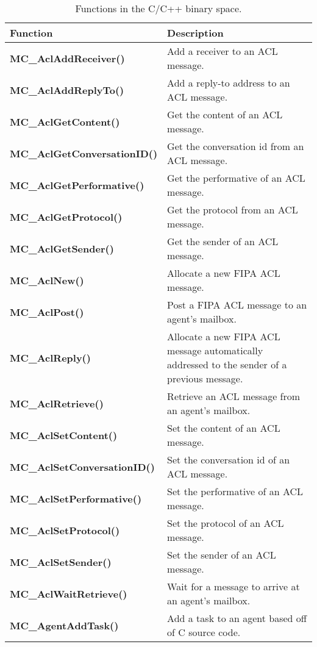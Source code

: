 \begin{table}[!hp]
\capstart
\begin{center}
\caption{Functions in the C/C++ binary space.}
\begin{tabular}{p{78 mm}p{77 mm}}
\hline
Function & Description \\
\hline
{\bf MC\_AclAddReceiver()} \dotfill & Add a receiver to an ACL message. \\
{\bf MC\_AclAddReplyTo()} \dotfill & Add a reply-to address to an ACL message. \\
{\bf MC\_AclGetContent()} \dotfill & Get the content of an ACL message. \\
{\bf MC\_AclGetConversationID()} \dotfill & Get the conversation id from an ACL message. \\
{\bf MC\_AclGetPerformative()} \dotfill & Get the performative of an ACL message. \\
{\bf MC\_AclGetProtocol()} \dotfill & Get the protocol from an ACL message. \\
{\bf MC\_AclGetSender()} \dotfill & Get the sender of an ACL message. \\
{\bf MC\_AclNew()} \dotfill & Allocate a new FIPA ACL message. \\
{\bf MC\_AclPost()} \dotfill & Post a FIPA ACL message to an agent's mailbox. \\
{\bf MC\_AclReply()} \dotfill & Allocate a new FIPA ACL message automatically addressed to the sender of a previous message. \\
{\bf MC\_AclRetrieve()} \dotfill & Retrieve an ACL message from an agent's mailbox. \\
{\bf MC\_AclSetContent()} \dotfill & Set the content of an ACL message. \\
{\bf MC\_AclSetConversationID()} \dotfill & Set the conversation id of an ACL message. \\
{\bf MC\_AclSetPerformative()} \dotfill & Set the performative of an ACL message. \\
{\bf MC\_AclSetProtocol()} \dotfill & Set the protocol of an ACL message. \\
{\bf MC\_AclSetSender()} \dotfill & Set the sender of an ACL message. \\
{\bf MC\_AclWaitRetrieve()} \dotfill & Wait for a message to arrive at an agent's mailbox. \\
{\bf MC\_AgentAddTask()} \dotfill & Add a task to an agent based off of C source code. \\

\end{tabular}
\end{center}
\end{table}
